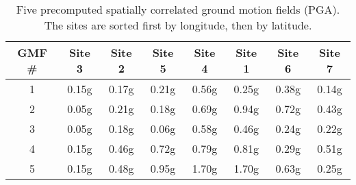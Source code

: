 \begin{table}[htbp]

\centering
\begin{tabular}{ c c c c c c c c }

\hline
\rowcolor{anti-flashwhite}
\bf{GMF \#} & \bf{Site 3} & \bf{Site 2} & \bf{Site 5} & \bf{Site 4} & \bf{Site 1} & \bf{Site 6} & \bf{Site 7}\\
\hline
1 & 0.15g & 0.17g & 0.21g & 0.56g & 0.25g & 0.38g & 0.14g \\
2 & 0.05g & 0.21g & 0.18g & 0.69g & 0.94g & 0.72g & 0.43g \\
3 & 0.05g & 0.18g & 0.06g & 0.58g & 0.46g & 0.24g & 0.22g \\
4 & 0.15g & 0.46g & 0.72g & 0.79g & 0.81g & 0.29g & 0.51g \\
5 & 0.15g & 0.48g & 0.95g & 1.70g & 1.70g & 0.63g & 0.25g \\
\hline
\end{tabular}

\caption{Five precomputed spatially correlated ground motion fields (PGA). The sites are sorted first by longitude, then by latitude.}
\label{tab:gmfs-diff-l7-5}
\end{table}